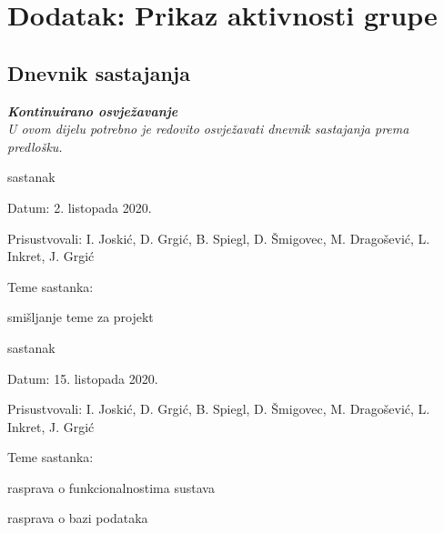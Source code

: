 \chapter*{Dodatak: Prikaz aktivnosti grupe}

\section*{Dnevnik sastajanja}

\textbf{\textit{Kontinuirano osvježavanje}}\\

\textit{U ovom dijelu potrebno je redovito osvježavati dnevnik sastajanja prema predlošku.}

\begin{packed_enum}
	\item  sastanak
	
	\item[] \begin{packed_item}
		\item Datum: 2. listopada 2020.
		\item Prisustvovali: I. Joskić, D. Grgić, B. Spiegl, D. Šmigovec, M. Dragošević, L. Inkret, J. Grgić
		\item Teme sastanka:
		\begin{packed_item}
			\item  smišljanje teme za projekt
		\end{packed_item}
	\end{packed_item}
	
	\item  sastanak
	\item[] \begin{packed_item}
		\item Datum: 15. listopada 2020.
		\item Prisustvovali: I. Joskić, D. Grgić, B. Spiegl, D. Šmigovec, M. Dragošević, L. Inkret, J. Grgić
		\item Teme sastanka:
		\begin{packed_item}
			\item  rasprava o funkcionalnostima sustava
			\item  rasprava o bazi podataka
		\end{packed_item}
	\end{packed_item}
	
	
\end{packed_enum}

